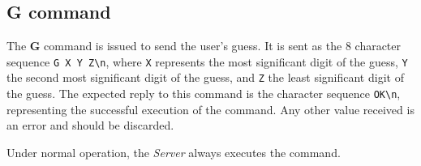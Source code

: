 \documentclass[conference, a4paper]{IEEEtran}
\begin{document}
\subsection{G command}
The \textbf{G} command is issued to send the user's guess. It is sent as the 8 character sequence \texttt{G X Y Z\textbackslash n}, where \texttt{X} represents the most significant digit of the guess, \texttt{Y} the second most significant digit of the guess, and \texttt{Z} the least significant digit of the guess. The expected reply to this command is the character sequence \texttt{OK\textbackslash n}, representing the successful execution of the command. Any other value received is an error and should be discarded.

Under normal operation, the \textit{Server} always executes the command.
\end{document}
